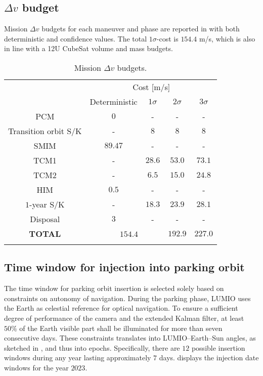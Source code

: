 \subsection{$\Delta v$ budget}
\label{subsec:deltavbudget}
Mission $\Delta v$ budgets for each maneuver and phase are reported in  with both deterministic and confidence values. The total $1\sigma$-cost is $154.4$ m/s, which is also in line with a 12U CubeSat volume and mass  budgets.
%
\begin{table}[!h]
	\caption{Mission $\Delta v$ budgets.}
	\label{tab:MissiondvBudgets}
	\centering
	\begin{tabular}{ccc|cc}
		\TOPlines
		\multirow{2}{*}{Maneuver} & \multicolumn{4}{c}{Cost [m/s]} \\
		& Deterministic & $1\sigma$ & $2\sigma$ & $3\sigma$ \\
		\MIDline
		PCM               & $0$  & - & - & - \\
		Transition orbit S/K & - & $8$ & $8$ & $8$ \\
		SMIM              & $89.47$ & - & - & - \\
		TCM1              & - & $28.6$ & $53.0$ & $73.1$ \\
		TCM2              & - & $6.5$ & $15.0$ & $24.8$ \\
		HIM               & $0.5$ & - & - & - \\
		$1$-year S/K & - & $18.3$ & $23.9$ & $28.1$ \\
		Disposal          & $3$ & - & - & - \\
		\MIDline
		\textbf{TOTAL} & \multicolumn{2}{c}{\ \ $154.4$} & $192.9$ & $227.0$ \\
		\BOTTOMlines
	\end{tabular}
\end{table}
%

\subsection{Time window for injection into parking orbit}\label{subsec:Time window for injection into parking orbit}
The time window for parking orbit insertion is selected solely based on constraints on autonomy of navigation. During the parking phase, LUMIO uses the Earth as celestial reference for optical navigation. To ensure a sufficient degree of performance of the camera and the extended Kalman filter, at least $50\%$ of the Earth visible part shall be illuminated for more than seven consecutive days. These constraints translates into LUMIO--Earth--Sun angles, as sketched in , and thus into epochs. Specifically, there are $12$ possible insertion windows during any year lasting approximately $7$ days.  displays the injection date windows for the year $2023$.

